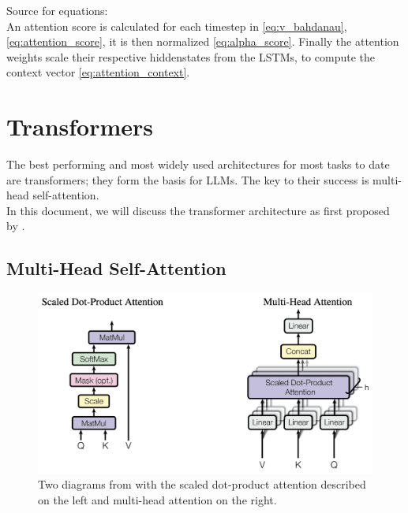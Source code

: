 \documentclass{article}
\begin{document}
Source for equations: \cite{cristina_2023_bahdanau}
\\[2em]
An attention score is calculated for each timestep in \eqref{eq:v_bahdanau}, \eqref{eq:attention_score}, it is then normalized \eqref{eq:alpha_score}. Finally the attention weights scale their respective hiddenstates from the LSTMs, to compute the context vector \eqref{eq:attention_context}.

\section{Transformers} \label{sec:transformers}
The best performing and most widely used architectures for most tasks to date are transformers; they form the basis for LLMs. The key to their success is multi-head self-attention.
\\[2em]
In this document, we will discuss the transformer architecture as first proposed by \cite{vaswani2023attentionneed}.

\subsection{Multi-Head Self-Attention}
\begin{figure}[htbp]
    \centering
    \includegraphics[width=0.5\paperwidth]{images/dotproduct_1.png}
    \caption{Two diagrams from \cite{vaswani2023attentionneed} with the scaled dot-product attention described on the left and multi-head attention on the right.}
    \label{fig:MHAttention}
\end{figure}
\end{document}
